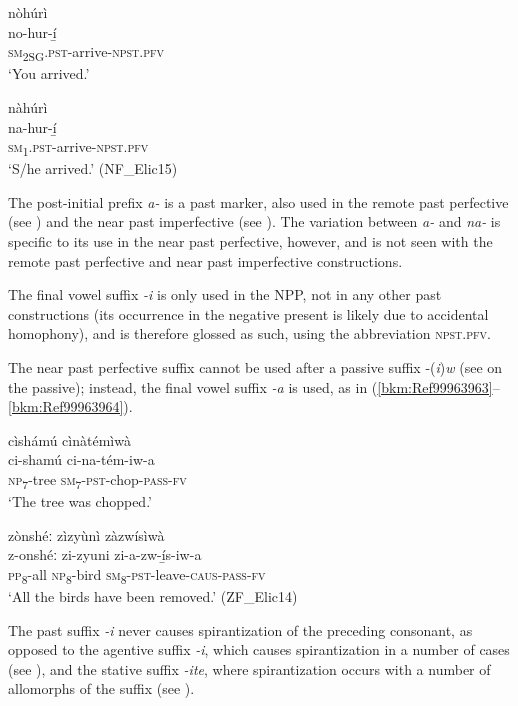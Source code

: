 \ea
\label{bkm:Ref99963922}
\glll nòhúrì\\
no-hur-í̲\\
\textsc{sm}\textsubscript{2SG}.\textsc{pst}-arrive-\textsc{npst}.\textsc{pfv}\\
\glt ‘You arrived.’
\z

\ea
\label{bkm:Ref99963923}
\glll nàhúrì\\
na-hur-í̲\\
\textsc{sm}\textsubscript{1}.\textsc{pst}-arrive-\textsc{npst}.\textsc{pfv}\\
\glt ‘S/he arrived.’ (NF\_Elic15)
\z

The post-initial prefix \textit{a-} is a past marker, also used in the remote past perfective (see ) and the near past imperfective (see ). The variation between \textit{a-} and \textit{na-} is specific to its use in the near past perfective, however, and is not seen with the remote past perfective and near past imperfective constructions.

The final vowel suffix \textit{-i} is only used in the NPP, not in any other past constructions (its occurrence in the negative present is likely due to accidental homophony), and is therefore glossed as such, using the abbreviation \textsc{npst}.\textsc{pfv}.

The near past perfective suffix cannot be used after a passive suffix -(\textit{i})\textit{w} (see  on the passive); instead, the final vowel suffix \textit{-a} is used, as in (\ref{bkm:Ref99963963}--\ref{bkm:Ref99963964}).

\ea
\label{bkm:Ref99963963}
cìshámú cìnàtémìwà\\
\gll ci-shamú  ci-na-tém-iw-a\\
\textsc{np}\textsubscript{7}-tree  \textsc{sm}\textsubscript{7}-\textsc{pst}-chop-\textsc{pass}-\textsc{fv}\\
\glt ‘The tree was chopped.’
\z

\ea
\label{bkm:Ref99963964}
zònshéː zìzyùnì zàzwísìwà\\
\gll z-onshéː  zi-zyuni  zi-a-zw-í̲s-iw-a\\
\textsc{pp}\textsubscript{8}-all    \textsc{np}\textsubscript{8}-bird  \textsc{sm}\textsubscript{8}-\textsc{pst}-leave-\textsc{caus}-\textsc{pass}-\textsc{fv}\\
\glt ‘All the birds have been removed.’ (ZF\_Elic14)
\z

The past suffix \textit{-i} never causes spirantization of the preceding consonant, as opposed to the agentive suffix \textit{-i}, which causes spirantization in a number of cases (see ), and the stative suffix \textit{\--ite}, where spirantization occurs with a number of allomorphs of the suffix (see ).

